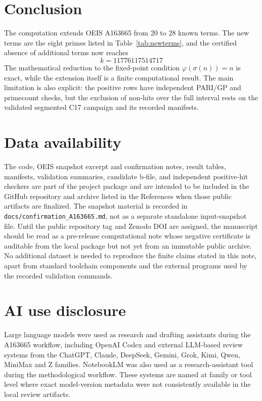 \documentclass[11pt]{article}
\theoremstyle{definition}
\theoremstyle{remark}
\newcommand{\seqid}{A163665}
\begin{document}
\section{Conclusion}

The computation extends OEIS \seqid{} from 20 to 28 known terms.  The
new terms are the eight primes listed in Table~\ref{tab:newterms}, and
the certified absence of additional terms now reaches
\[
  k=11776117514717
\]
The mathematical reduction to the fixed-point condition
\(\varphi(\sigma(n))=n\) is exact, while the extension itself is a finite
computational result.  The main limitation is also explicit: the positive
rows have independent PARI/GP and primecount checks, but the exclusion of
non-hits over the full interval rests on the validated segmented C17
campaign and its recorded manifests.

\section*{Data availability}

The code, OEIS snapshot excerpt and confirmation notes, result tables,
manifests, validation summaries, candidate b-file, and independent
positive-hit checkers are part of the project package and are intended to
be included in the GitHub repository and archive listed in the References
when those public artifacts are finalized.  The snapshot material is
recorded in \texttt{docs/confirmation\_A163665.md}, not as a separate
standalone input-snapshot file.  Until the public repository tag and
Zenodo DOI are assigned, the manuscript should be read as a pre-release
computational note whose negative certificate is auditable from the local
package but not yet from an immutable public archive.  No additional
dataset is needed to reproduce the finite claims stated in this note,
apart from standard toolchain components and the external programs used
by the recorded validation commands.

\section*{AI use disclosure}

Large language models were used as research and drafting assistants during the
\seqid{} workflow, including OpenAI Codex and external LLM-based review systems
from the ChatGPT, Claude, DeepSeek, Gemini, Grok, Kimi, Qwen, MiniMax and Z
families.  NotebookLM was also used as a research-assistant tool during the
methodological workflow.  These systems are named at family or tool level where
exact model-version metadata were not consistently available in the local
review artifacts.
\end{document}
